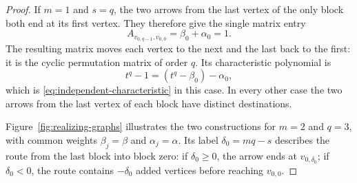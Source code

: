 \documentclass[11pt,a4paper]{article}
\theoremstyle{definition}
\theoremstyle{remark}
\numberwithin{equation}{section}
\begin{document}
\begin{proof}
If $m=1$ and $s=q$, the two arrows from the last vertex of the only block both end at its first vertex. They therefore give the single matrix entry
\[
 A_{v_{0,q-1},v_{0,0}}=\beta_0+\alpha_0=1.
\]
The resulting matrix moves each vertex to the next and the last back to the first: it is the cyclic permutation matrix of order $q$. Its characteristic polynomial is
\[
 t^q-1=(t^q-\beta_0)-\alpha_0,
\]
which is \eqref{eq:independent-characteristic} in this case. In every other case the two arrows from the last vertex of each block have distinct destinations.

Figure~\ref{fig:realizing-graphs} illustrates the two constructions for $m=2$ and $q=3$, with common weights $\beta_j=\beta$ and $\alpha_j=\alpha$. Its label $\delta_0=mq-s$ describes the route from the last block into block zero: if $\delta_0\ge0$, the arrow ends at $v_{0,\delta_0}$; if $\delta_0<0$, the route contains $-\delta_0$ added vertices before reaching $v_{0,0}$.


\end{proof}
\end{document}
